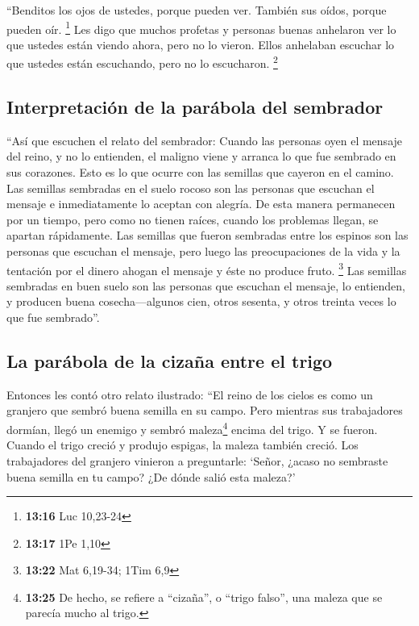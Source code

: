  ``Benditos los ojos de ustedes, porque pueden ver.
También sus oídos, porque pueden oír. \footnote{\textbf{13:16} Luc
  10,23-24}  Les digo que muchos profetas y personas
buenas anhelaron ver lo que ustedes están viendo ahora, pero no lo
vieron. Ellos anhelaban escuchar lo que ustedes están escuchando, pero
no lo escucharon. \footnote{\textbf{13:17} 1Pe 1,10}

\hypertarget{interpretaciuxf3n-de-la-paruxe1bola-del-sembrador}{%
\subsection{Interpretación de la parábola del
sembrador}\label{interpretaciuxf3n-de-la-paruxe1bola-del-sembrador}}

 ``Así que escuchen el relato del sembrador:
 Cuando las personas oyen el mensaje del reino, y no lo
entienden, el maligno viene y arranca lo que fue sembrado en sus
corazones. Esto es lo que ocurre con las semillas que cayeron en el
camino.  Las semillas sembradas en el suelo rocoso son
las personas que escuchan el mensaje e inmediatamente lo aceptan con
alegría.  De esta manera permanecen por un tiempo, pero
como no tienen raíces, cuando los problemas llegan, se apartan
rápidamente.  Las semillas que fueron sembradas entre los
espinos son las personas que escuchan el mensaje, pero luego las
preocupaciones de la vida y la tentación por el dinero ahogan el mensaje
y éste no produce fruto. \footnote{\textbf{13:22} Mat 6,19-34; 1Tim 6,9}
 Las semillas sembradas en buen suelo son las personas
que escuchan el mensaje, lo entienden, y producen buena
cosecha---algunos cien, otros sesenta, y otros treinta veces lo que fue
sembrado''.

\hypertarget{la-paruxe1bola-de-la-cizauxf1a-entre-el-trigo}{%
\subsection{La parábola de la cizaña entre el
trigo}\label{la-paruxe1bola-de-la-cizauxf1a-entre-el-trigo}}

 Entonces les contó otro relato ilustrado: ``El reino de
los cielos es como un granjero que sembró buena semilla en su campo.
 Pero mientras sus trabajadores dormían, llegó un enemigo
y sembró maleza\footnote{\textbf{13:25} De hecho, se refiere a
  ``cizaña'', o ``trigo falso'', una maleza que se parecía mucho al
  trigo.} encima del trigo. Y se fueron.  Cuando el trigo
creció y produjo espigas, la maleza también creció.  Los
trabajadores del granjero vinieron a preguntarle: `Señor, ¿acaso no
sembraste buena semilla en tu campo? ¿De dónde salió esta maleza?'

